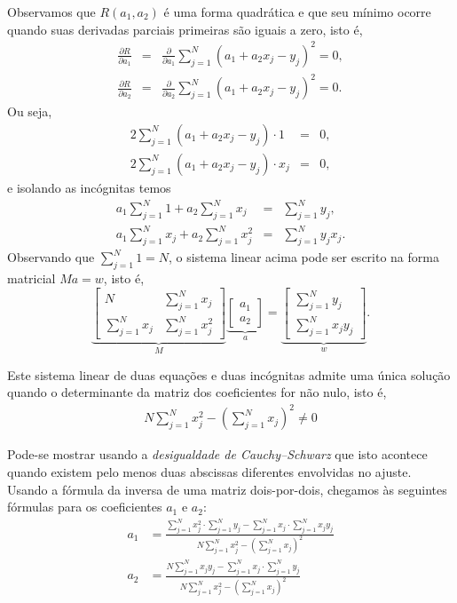 Observamos que $R(a_1,a_2)$ é uma forma quadrática e que seu mínimo ocorre quando suas derivadas parciais primeiras são iguais a zero, isto é,
\begin{eqnarray}
  \frac{\partial R}{\partial a_1} &=& \frac{\partial }{\partial a_1} \sum_{j=1}^N (a_1 + a_2 x_j-y_j)^2 =0, \\
  \frac{\partial R}{\partial a_2} &=& \frac{\partial }{\partial a_2} \sum_{j=1}^N (a_1 + a_2 x_j-y_j)^2 =0.
\end{eqnarray}
Ou seja,
\begin{eqnarray}
   2 \sum_{j=1}^N (a_1 + a_2 x_j-y_j)\cdot 1 &=&0, \\
   2 \sum_{j=1}^N (a_1 + a_2 x_j-y_j)\cdot x_j &=&0,
\end{eqnarray}
e isolando as incógnitas temos
\begin{eqnarray}
   a_1\sum_{j=1}^N 1 + a_2 \sum_{j=1}^Nx_j &=&\sum_{j=1}^N y_j,\\
   a_1\sum_{j=1}^N x_j + a_2 \sum_{j=1}^Nx_j^2 &=&\sum_{j=1}^N y_jx_j.
\end{eqnarray}
Observando que $\sum_{j=1}^N 1=N$, o sistema linear acima pode ser escrito na forma matricial $Ma = w$, isto é,
\begin{equation}\label{eq:smq_reta}
  \underbrace{\begin{bmatrix}
     N &  \sum_{j=1}^N x_j \\
     \sum_{j=1}^N x_j &  \sum_{j=1}^N x_j^2
  \end{bmatrix}}_{M}
  \underbrace{\begin{bmatrix}
     a_1 \\
     a_2
  \end{bmatrix}}_{a} =
  \underbrace{\begin{bmatrix}
     \sum_{j=1}^N y_j \\
     \sum_{j=1}^N x_j y_j
  \end{bmatrix}}_{w}.
\end{equation}

Este sistema linear de duas equações e duas incógnitas admite uma única solução quando o determinante da matriz dos coeficientes for não nulo, isto é,
\begin{eqnarray}
N \sum_{j=1}^N x_j^2 - \left(\sum_{j=1}^N x_j\right)^2 \neq 0
\end{eqnarray}

Pode-se mostrar usando a \emph{desigualdade de Cauchy–Schwarz} que isto acontece quando existem pelo menos duas abscissas diferentes envolvidas no ajuste.  Usando a fórmula da inversa de uma matriz dois-por-dois, chegamos às seguintes fórmulas para os coeficientes $a_1$ e $a_2$:
  \begin{equation}\label{eq:formula_final_ajuste_reta}
    \begin{split}
    a_1 &= \frac{\sum_{j=1}^N x_j^2  \cdot \sum_{j=1}^N y_j - \sum_{j=1}^N x_j \cdot \sum_{j=1}^N x_jy_j}{N \sum_{j=1}^N x_j^2 - \left(\sum_{j=1}^N x_j\right)^2}\\
    a_2 &= \frac{N \sum_{j=1}^N x_jy_j - \sum_{j=1}^N x_j  \cdot \sum_{j=1}^N y_j }{N \sum_{j=1}^N x_j^2 - \left(\sum_{j=1}^N x_j\right)^2}
    \end{split}
\end{equation}

